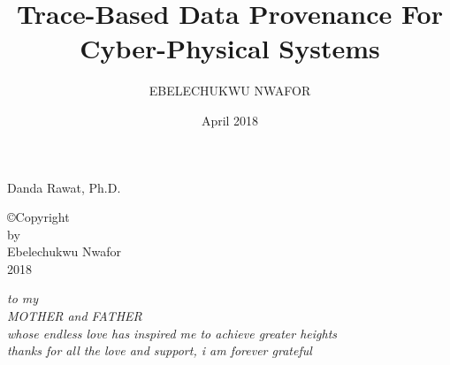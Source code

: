 \documentclass[12pt]{report}
\begin{document}

\setcounter{tocdepth}{2}


\title{Trace-Based Data Provenance For Cyber-Physical Systems}

\author{EBELECHUKWU NWAFOR}
\date{April 2018}


                 {Danda Rawat, Ph.D.}
                 
               
                 

				


\makesigpage

\begin{CenteredPage}
\copyright Copyright\\[0.2in]
by\\[0.2in]
Ebelechukwu Nwafor\\[0.2in]
2018
\end{CenteredPage}

\begin{CenteredPage}
{\it to my\\[0.2in]
MOTHER and FATHER\\[0.2in]
whose endless love has inspired me to achieve greater heights \\ [0.2in]
thanks for all the love and support, i am forever grateful}
\end{CenteredPage}
\maketitlepage
\end{document}
